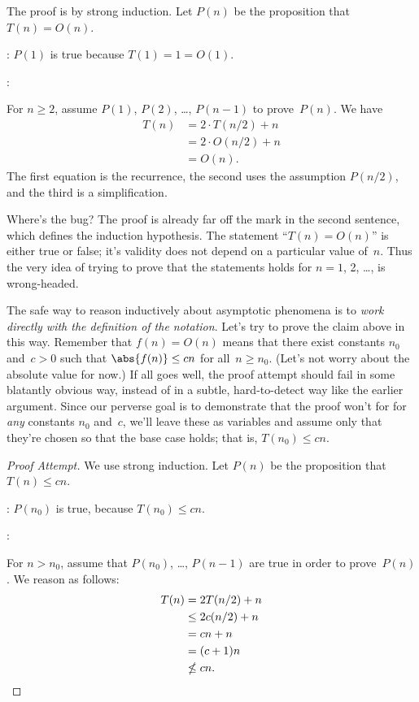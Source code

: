 \begin{falseproof}
The proof is by strong induction.  Let $P(n)$ be the proposition that
$T(n) = O(n)$.

: $P(1)$ is true because $T(1) = 1 = O(1)$.

:

For $n \ge 2$, assume $P(1)$, $P(2)$, \dots, $P(n - 1)$ to
prove~$P(n)$.  We have
\begin{align*}
    T(n)    &= 2 \cdot T(n/2) + n \\
            &= 2 \cdot O(n/2) + n \\
            &= O(n).
\end{align*}
The first equation is the recurrence, the second uses the assumption
$P(n/2)$, and the third is a simplification.
\end{falseproof}

Where's the bug?  The proof is already far off the mark in the second
sentence, which defines the induction hypothesis.  The statement
``$T(n) = O(n)$'' is either true or false; it's validity does not
depend on a particular value of~$n$.  Thus the very idea of trying to
prove that the statements holds for $n = 1$, 2, \dots, is
wrong-headed.

The safe way to reason inductively about asymptotic phenomena is to
\emph{work directly with the definition of the notation}.  Let's try
to prove the claim above in this way.  Remember that $f(n) = O(n)$
means that there exist constants $n_0$ and~$c > 0$ such that
$\abs{f(n)} \le cn$ for all~$n \ge n_0$.  (Let's not worry about the
absolute value for now.)  If all goes well, the proof attempt should
fail in some blatantly obvious way, instead of in a subtle,
hard-to-detect way like the earlier argument.  Since our perverse goal
is to demonstrate that the proof won't for for \emph{any} constants
$n_0$ and~$c$, we'll leave these as variables and assume only that
they're chosen so that the base case holds; that is, $T(n_0) \le cn$.

\begin{proof}[Proof Attempt]
We use strong induction.  Let $P(n)$ be the proposition that $T(n) \le
cn$.

:
$P(n_0)$ is true, because $T(n_0) \le cn$.

:

For $n > n_0$, assume that $P(n_0)$, \dots, $P(n - 1)$ are true in
order to prove~$P(n)$.  We reason as follows:
\begin{align*}
T(n)    &=   2 T(n/2) + n \\
        &\le 2 c(n/2) + n \\
        &=   cn + n \\
        &=   (c + 1) n \\
        &\nleq c n. \qedhere
\end{align*}
\end{proof}

